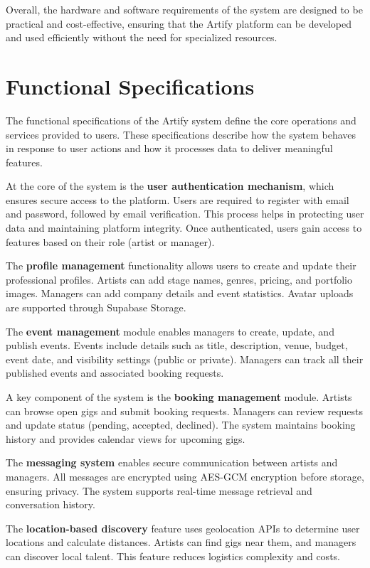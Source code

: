 \documentclass[12pt,a4paper]{report}
\begin{document}
Overall, the hardware and software requirements of the system are designed to be practical and cost-effective, ensuring that the Artify platform can be developed and used efficiently without the need for specialized resources.

\section{Functional Specifications}

The functional specifications of the Artify system define the core operations and services provided to users. These specifications describe how the system behaves in response to user actions and how it processes data to deliver meaningful features.

At the core of the system is the \textbf{user authentication mechanism}, which ensures secure access to the platform. Users are required to register with email and password, followed by email verification. This process helps in protecting user data and maintaining platform integrity. Once authenticated, users gain access to features based on their role (artist or manager).

The \textbf{profile management} functionality allows users to create and update their professional profiles. Artists can add stage names, genres, pricing, and portfolio images. Managers can add company details and event statistics. Avatar uploads are supported through Supabase Storage.

The \textbf{event management} module enables managers to create, update, and publish events. Events include details such as title, description, venue, budget, event date, and visibility settings (public or private). Managers can track all their published events and associated booking requests.

A key component of the system is the \textbf{booking management} module. Artists can browse open gigs and submit booking requests. Managers can review requests and update status (pending, accepted, declined). The system maintains booking history and provides calendar views for upcoming gigs.

The \textbf{messaging system} enables secure communication between artists and managers. All messages are encrypted using AES-GCM encryption before storage, ensuring privacy. The system supports real-time message retrieval and conversation history.

The \textbf{location-based discovery} feature uses geolocation APIs to determine user locations and calculate distances. Artists can find gigs near them, and managers can discover local talent. This feature reduces logistics complexity and costs.
\end{document}
